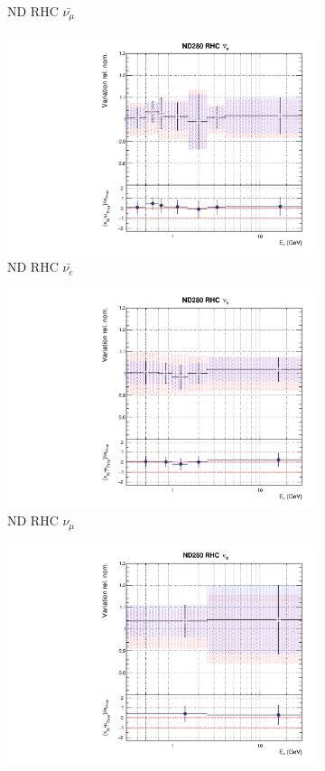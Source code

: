 \begin{figure}[t]
\begin{subfigure}{0.24\textwidth}
  \caption{ND RHC $\bar{\nu_{\mu}}$}
\end{subfigure}
\begin{subfigure}{0.24\textwidth}
  \centering
  \includegraphics[width=0.95\linewidth]{figs/rhcmpdat248flux_5}
  \caption{ND RHC $\bar{\nu_{e}}$}
\end{subfigure}
\begin{subfigure}{0.24\textwidth}
  \centering
  \includegraphics[width=0.95\linewidth]{figs/rhcmpdat248flux_6}
  \caption{ND RHC $\nu_{\mu}$}
\end{subfigure}
\vspace{15mm}
\begin{subfigure}{0.24\textwidth}
  \centering
  \includegraphics[width=0.95\linewidth]{figs/rhcmpdat248flux_7}

\end{subfigure}
\end{figure}
